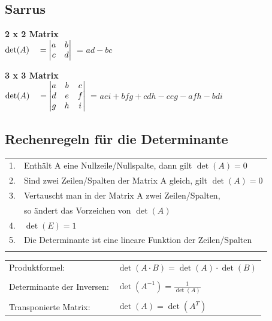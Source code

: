 		    \subsection{Sarrus}
			\begin{minipage}{0.4\linewidth}
		    \textbf{2 x 2 Matrix}\\
		    $\det(A) \quad= 	\begin{vmatrix}
		    				a & b \\
		    				c & d
		    				\end{vmatrix} \\ $ =  $ad - bc$ \\
			\end{minipage}
			\hfill
			\begin{minipage}{0.6\linewidth}
		    \textbf{3 x 3 Matrix}\\
		    $\det(A) \quad= 	\begin{vmatrix}
		    					a & b &c \\
		    					d & e & f\\
		    					g & h & i
		    				\end{vmatrix} \\ $ =  $aei + bfg + cdh - ceg - afh - bdi$ \\
			\end{minipage}				
		    				
		    \subsection{Rechenregeln für die Determinante}
			\begin{tabular}{ll}
			1. & Enthält A eine Nullzeile/Nullspalte, dann gilt $\det(A) = 0$ \\
		    2. & Sind zwei Zeilen/Spalten der Matrix A gleich, gilt $\det(A) = 0$ \\
		    3. &  Vertauscht man in der Matrix A zwei Zeilen/Spalten, \\
		    &  so ändert das Vorzeichen von $\det(A)$ \\
		    4. & $\det(E) = 1$ \\
		    5. & Die Determinante ist eine lineare Funktion der Zeilen/Spalten \\
		    \\
			\end{tabular}
		    
		    \begin{tabular}{ll}
		    Produktformel: &$\det(A \cdot B) = \det(A) \cdot \det(B)$ \\
		    \\
		    Determinante der Inversen: & $\det(A^{-1}) = \frac{1}{\det(A)}$ \\
		    \\
		    Transponierte Matrix: & $\det(A) = \det(A^T)$ \\
		    \end{tabular}
		    
